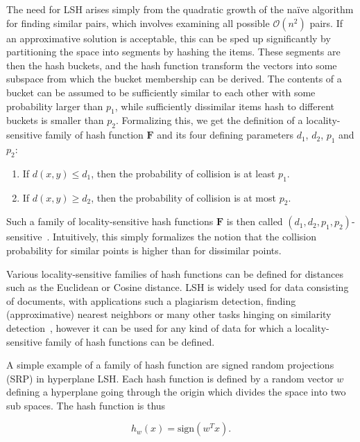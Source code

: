 The need for LSH arises simply from the quadratic growth of the na\"ive
algorithm for finding similar pairs, which involves examining all possible
$\mathcal{O}(n^2)$ pairs. If an approximative solution is acceptable, this can
be sped up significantly by partitioning the space into segments by hashing the
items. These segments are then the hash buckets, and the hash function
transform the vectors into some subspace from which the bucket membership can
be derived. The contents of a bucket can be assumed to be sufficiently similar
to each other with some probability larger than $p_1$, while sufficiently
dissimilar items hash to different buckets is smaller than $p_2$. Formalizing
this, we get the definition of a locality-sensitive family of hash function
$\mathbf{F}$ and its four defining parameters $d_1$, $d_2$, $p_1$ and $p_2$:

\begin{enumerate}
  \item If $d(x, y) \leq d_1$, then the probability of collision is at least $p_1$.
  \item If $d(x, y) \geq d_2$, then the probability of collision is at most $p_2$.
\end{enumerate}

Such a family of locality-sensitive hash functions $\mathbf{F}$ is then called
$(d_1, d_2, p_1, p_2)$-sensitive~\cite{mmds}.  Intuitively, this simply
formalizes the notion that the collision probability for similar points is
higher than for dissimilar points.

Various locality-sensitive families of hash
functions can be defined for distances such as the Euclidean or Cosine
distance. LSH is widely used for data consisting of documents, with
applications such a plagiarism detection, finding (approximative) nearest
neighbors or many other tasks hinging on similarity detection~\cite{mmds},
however it can be used for any kind of data for which a locality-sensitive
family of hash functions can be defined.

A simple example of a family of hash function are signed random projections
(SRP) in hyperplane LSH. Each hash function is defined by a random vector $w$
defining a hyperplane going through the origin which divides the space into two
sub spaces. The hash function is thus

\begin{equation}
  h_w(x) = \text{sign}(w^T x).
\end{equation}

